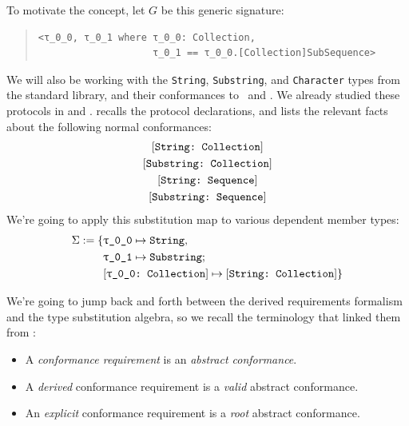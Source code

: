 \documentclass[../generics]{subfiles}
\begin{document}
\begin{example}\label{conformance path example}
To motivate the concept, let $G$ be this generic signature:
\begin{quote}
\begin{verbatim}
<τ_0_0, τ_0_1 where τ_0_0: Collection,
                    τ_0_1 == τ_0_0.[Collection]SubSequence>
\end{verbatim}
\end{quote}
We will also be working with the \texttt{String}, \texttt{Substring}, and \texttt{Character} types from the standard library, and their conformances to \tSequence\ and \tCollection. We already studied these protocols in  and .  recalls the protocol declarations, and lists the relevant facts about the following normal conformances:
\begin{gather*}
\StringCollection\\
\SubstringCollection\\
\StringSequence\\
\SubstringSequence
\end{gather*}
We're going to apply this substitution map to various dependent member types:
\begin{align*}
\Sigma := \SubstMapC{
&\SubstType{\rT}{String},\\
&\SubstType{\rU}{Substring}
}{
\\
&\SubstConf{\rT}{String}{Collection}
}
\end{align*}

We're going to jump back and forth between the derived requirements formalism and the type substitution algebra, so we recall the terminology that linked them from :
\begin{itemize}
\item A \emph{conformance requirement} is an \emph{abstract conformance}.
\item A \emph{derived} conformance requirement is a \emph{valid} abstract conformance.
\item An \emph{explicit} conformance requirement is a \emph{root} abstract conformance.
\end{itemize}


\end{example}
\end{document}
